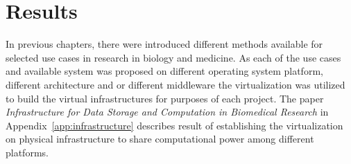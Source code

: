 \section{Results}
\label{sec:results}
In previous chapters, there were introduced different methods available for selected use cases in research in biology and medicine. 
As each of the use cases and available system was proposed on different operating system platform, different architecture and or different middleware the virtualization was utilized to build the virtual infrastructures for purposes of each project. The paper \cite{kulhanek2010c} \emph{Infrastructure for Data Storage and Computation in Biomedical Research} in Appendix~\ref{app:infrastructure} describes result of establishing the virtualization on physical infrastructure to share computational power among different platforms.
